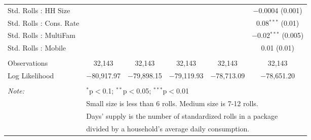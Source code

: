 \begin{table}[!htbp]
\begin{tabular}{@{\extracolsep{5pt}}lccccc}
  Std. Rolls : HH Size &  &  &  &  & $-$0.0004 (0.001) \\ 
  Std. Rolls : Cons. Rate &  &  &  &  & 0.08$^{***}$ (0.01) \\ 
  Std. Rolls : MultiFam &  &  &  &  & $-$0.02$^{***}$ (0.005) \\ 
  Std. Rolls : Mobile &  &  &  &  & 0.01 (0.01) \\ 
 \hline \\[-1.8ex] 
Observations & 32,143 & 32,143 & 32,143 & 32,143 & 32,143 \\ 
Log Likelihood & $-$80,917.97 & $-$79,898.15 & $-$79,119.93 & $-$78,713.09 & $-$78,651.20 \\ 
\hline 
\hline \\[-1.8ex] 
\textit{Note:}  & \multicolumn{5}{l}{$^{*}$p$<$0.1; $^{**}$p$<$0.05; $^{***}$p$<$0.01} \\ 
 & \multicolumn{5}{l}{Small size is less than 6 rolls. Medium size is 7-12 rolls. } \\ 
 & \multicolumn{5}{l}{Days' supply is the number of standardized rolls in a package} \\ 
 & \multicolumn{5}{l}{divided by a household's average daily consumption.} \\ 
\end{tabular} 
\end{table} 
